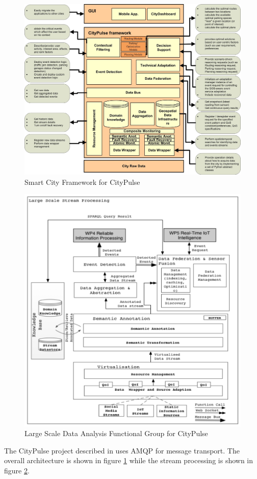 \documentclass[parskip=half]{scrartcl}
\begin{document}
\begin{figure}
	\centering
	\includegraphics[width=\textwidth]{Tsiatsis_2015b}
	\caption{Smart City Framework for CityPulse~\cite[p.~39]{Tsiatsis.2015}}
	\label{fig:citypulse-framework}
\end{figure}

\begin{figure}
	\centering
	\includegraphics[width=\textwidth]{Tsiatsis_2015}
	\caption{Large Scale Data Analysis Functional Group for CityPulse~\cite[p.~25]{Tsiatsis.2015}}
	\label{fig:citypulse-streaming}
\end{figure}

The CityPulse project described in \cite{Tsiatsis.2015, Presser.2014, Presser.2016, Puiu.2016, Puiu.2016b} uses AMQP for message transport. The overall architecture is shown in figure \ref{fig:citypulse-framework} while the stream processing is shown in figure \ref{fig:citypulse-streaming}.


\clearpage
\printbibliography
\end{document}
